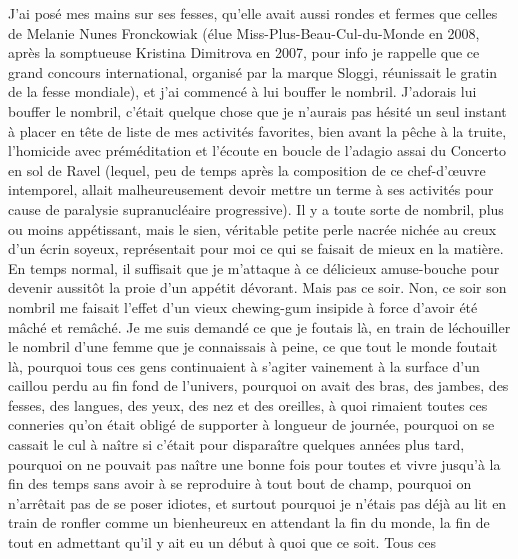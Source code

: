 J’ai posé mes mains sur ses fesses, qu’elle avait aussi rondes et fermes que celles de Melanie Nunes Fronckowiak (élue Miss-Plus-Beau-Cul-du-Monde en 2008, après la somptueuse Kristina Dimitrova en 2007, pour info je rappelle que ce grand concours international, organisé par la marque Sloggi, réunissait le gratin de la fesse mondiale), et j’ai commencé à lui bouffer le nombril. J’adorais lui bouffer le nombril, c’était quelque chose que je n’aurais pas hésité un seul instant à placer en tête de liste de mes activités favorites, bien avant la pêche à la truite, l’homicide avec préméditation et l’écoute en boucle de l’adagio assai du Concerto en sol de Ravel (lequel, peu de temps après la composition de ce chef-d’œuvre intemporel, allait malheureusement devoir mettre un terme à ses activités pour cause de paralysie supranucléaire progressive). Il y a toute sorte de nombril, plus ou moins appétissant, mais le sien, véritable petite perle nacrée nichée au creux d’un écrin soyeux, représentait pour moi ce qui se faisait de mieux en la matière. En temps normal, il suffisait que je m’attaque à ce délicieux amuse-bouche pour devenir aussitôt la proie d’un appétit dévorant. Mais pas ce soir. Non, ce soir son nombril me faisait l’effet d’un vieux chewing-gum insipide à force d’avoir été mâché et remâché. Je me suis demandé ce que je foutais là, en train de léchouiller le nombril d’une femme que je connaissais à peine, ce que tout le monde foutait là, pourquoi tous ces gens continuaient à s’agiter vainement à la surface d’un caillou perdu au fin fond de l’univers, pourquoi on avait des bras, des jambes, des fesses, des langues, des yeux, des nez et des oreilles, à quoi rimaient toutes ces conneries qu’on était obligé de supporter à longueur de journée, pourquoi on se cassait le cul à naître si c’était pour disparaître quelques années plus tard, pourquoi on ne pouvait pas naître une bonne fois pour toutes et vivre jusqu’à la fin des temps sans avoir à se reproduire à tout bout de champ, pourquoi on n’arrêtait pas de se poser idiotes, et surtout pourquoi je n’étais pas déjà au lit en train de ronfler comme un bienheureux en attendant la fin du monde, la fin de tout en admettant qu’il y ait eu un début à quoi que ce soit. Tous ces 